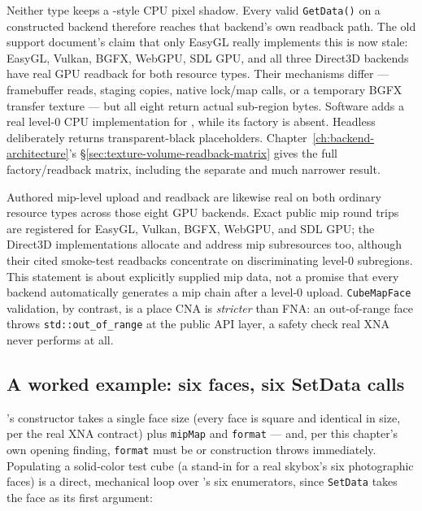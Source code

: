 Neither type keeps a -style CPU pixel shadow. Every valid
\texttt{GetData()} on a constructed backend therefore reaches that backend's own readback
path. The old support document's claim that only EasyGL really implements this is now stale:
EasyGL, Vulkan, BGFX, WebGPU, SDL GPU, and all three Direct3D backends have real GPU readback
for both resource types. Their mechanisms differ --- framebuffer reads, staging copies,
native lock/map calls, or a temporary BGFX transfer texture --- but all eight return actual
sub-region bytes. Software adds a real level-0 CPU implementation for
, while its  factory is absent. Headless deliberately
returns transparent-black placeholders. Chapter~\ref{ch:backend-architecture}'s
\S\ref{sec:texture-volume-readback-matrix} gives the full factory/readback matrix, including
the separate and much narrower  result.

Authored mip-level upload and readback are likewise real on both ordinary resource types
across those eight GPU backends. Exact public mip round trips are registered for EasyGL,
Vulkan, BGFX, WebGPU, and SDL GPU; the Direct3D implementations allocate and address mip
subresources too, although their cited smoke-test readbacks concentrate on discriminating
level-0 subregions. This statement is about explicitly supplied mip data, not a promise that
every backend automatically generates a mip chain after a level-0 upload.
\texttt{CubeMapFace} validation, by contrast, is a place CNA is \emph{stricter} than FNA: an
out-of-range face throws \texttt{std::out\_of\_range} at the public API layer, a safety check
real XNA never performs at all.

\subsection{A worked example: six faces, six SetData calls}

's constructor takes a single face size (every face is square and
identical in size, per the real XNA contract) plus \texttt{mipMap} and \texttt{format} --- and,
per this chapter's own opening finding, \texttt{format} must be
 or construction throws immediately. Populating a solid-color
test cube (a stand-in for a real skybox's six photographic faces) is a direct, mechanical loop
over 's six enumerators, since \texttt{SetData} takes the face as its
first argument:

